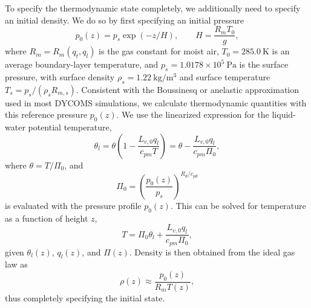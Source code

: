 \documentclass{article}
\begin{document}
To specify the thermodynamic state completely, we additionally need to specify an initial density. We do so by first specifying an initial pressure
\[
p_0(z) = p_{s} \exp(-z/H), \qquad H = \frac{R_m T_0}{g},
\]
where $R_m = R_m(q_t, q_l)$ is the gas constant for moist air, $T_0 = 285.0~\mathrm{K}$ is an average boundary-layer temperature, and $p_s = 1.0178\times 10^{5}~\mathrm{Pa}$ is the surface pressure, with surface density $\rho_s = 1.22~\mathrm{kg/m^3}$ and surface temperature $T_s = p_s/(\rho_s R_{m,s})$. Consistent with the Boussinesq or anelastic approximation used in most DYCOMS simulations, we calculate thermodynamic quantities with this reference pressure $p_0(z)$. We use the linearized expression for the liquid-water potential temperature,
\begin{equation}
    \label{eq:betts1973}
    \theta_l = \theta \left(1 - \frac{L_{v,0} q_l}{c_{pm} T} \right) = \theta - \frac{L_{v,0} q_l}{c_{pm} \Pi_0},
\end{equation}
where $\theta = T/\Pi_0$, and 
\[
\Pi_0 = \left( \frac{p_0(z)}{p_{s}} \right)^{R_d/c_{pd}}
\]
is evaluated with the pressure profile $p_0(z)$. This can be solved for temperature as a function of height $z$,
\[
T = \Pi_0 \theta_l + \frac{L_{v,0} q_l}{c_{pm} \Pi_0},
\]
given $\theta_l(z)$, $q_l(z)$, and $\Pi(z)$. Density is then obtained from the ideal gas law as
\[
\rho(z) \approx \frac{p_0(z)}{R_m T(z)},
\]
thus completely specifying the initial state. 
\end{document}
